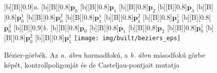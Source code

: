 \documentclass[12pt]{report}
\theoremstyle{definition}
\begin{document}
  \begin{figure}
  [b][B][0.9]{\emph{a.}}
  [b][B][0.8]{\bf{$\boldsymbol{p}_{0}$}}
  [b][B][0.8]{\bf{$\boldsymbol{p}_{1}$}}
  [b][B][0.8]{\bf{$\boldsymbol{p}_{2}$}}
  [b][B][0.8]{\bf{$\boldsymbol{p}_{3}$}}
  [b][B][0.8]{\bf{$\boldsymbol{p}_{0}^{1}$}}
  [b][B][0.8]{\bf{$\boldsymbol{p}_{0}^{2}$}}
  [b][B][0.8]{\bf{$\boldsymbol{p}_{1}^{1}$}}
  [b][B][0.8]{\bf{$\boldsymbol{p}_{1}^{2}$}}
  [b][B][0.8]{\bf{$\boldsymbol{p}_{2}^{1}$}}
  [b][B][0.8]{\bf{$\boldsymbol{p}_{0}^{3}$}}
  [b][B][0.9]{\emph{b.}}
  [b][B][0.8]{\bf{$\boldsymbol{p}_{0}$}}
  [b][B][0.8]{\bf{$\boldsymbol{p}_{1}$}}
  [b][B][0.8]{\bf{$\boldsymbol{p}_{2}$}}
  [b][B][0.8]{\bf{$\boldsymbol{p}_{0}^{1}$}}
  [b][B][0.8]{\bf{$\boldsymbol{p}_{0}^{2}$}}
  [b][B][0.8]{\bf{$\boldsymbol{p}_{1}^{1}$}}
    \centering
    \texttt{[image: img/built/beziers\_eps]}
    \caption{\label{fig:beziers} Bézier-görbék. Az \emph{a. ábra} harmadfokú, a
    \emph{b. ábra} másodfokú görbe képét, kontrollpoligonját és de
    Casteljau-pontjait mutatja}
  \end{figure}
\end{document}
